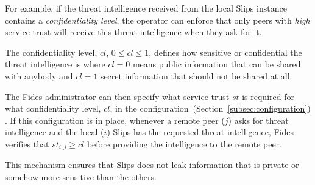 For example, if the threat intelligence received from the local Slips instance contains a \textit{confidentiality level}, the operator can enforce that only peers with \textit{high} service trust will receive this threat intelligence when they ask for it.

The confidentiality level, $cl$, $0 \leq cl \leq 1$, defines how sensitive or confidential the threat intelligence is where $cl = 0$ means public information that can be shared with anybody and $cl = 1$ secret information that should not be shared at all.

The Fides administrator can then specify what service trust $st$ is required for what confidentiality level, $cl$, in the configuration~(Section~\ref{subsec:configuration}) .
If this configuration is in place, whenever a remote peer ($j$) asks for threat intelligence and the local ($i$) Slips has the requested threat intelligence, Fides verifies that $st_{i, j} \geq cl$ before providing the intelligence to the remote peer.

This mechanism ensures that Slips does not leak information that is private or somehow more sensitive than the others.